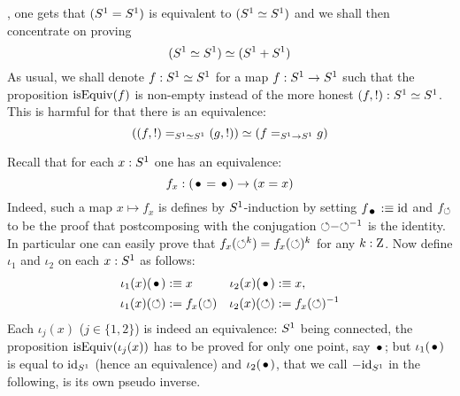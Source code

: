 \documentclass[english,a4paper]{tufte-handout}
\begin{document}
, one gets that $({S^1} = {S^1})$ is
equivalent to $({S^1} \simeq {S^1})$ and we shall then concentrate on
proving
\begin{equation}
  ({S^1} \simeq {S^1}) \simeq ({S^1}+{S^1})
\end{equation}
As usual, we shall denote $f:{S^1}\simeq{S^1}$ for a map $f:{S^1}\to {S^1} $
such that the proposition $\mathrm{isEquiv}(f)$ is non-empty instead of the more
honest $(f,!):{S^1} \simeq {S^1}$. This is harmful for that there is an
equivalence:
\begin{equation}
  ((f,!) =_{{S^1} \simeq {S^1}} (g,!)) \simeq (f=_{{S^1} \to {S^1}}g)
\end{equation}

Recall that for each $x:{S^1}$ one has an equivalence:
\begin{equation}
  \label{eq:8}
  f_x : (\base = \base) \to (x=x)
\end{equation}
Indeed, such a map $x\mapsto f_x$ is defines by ${S^1}$-induction by
setting $f_{\base} \defequi \id$ and $f_{\mathord{\circlearrowleft}}$ to be the proof that
postcomposing with the conjugation $\mathord{\circlearrowleft} \mathord{-} {\mathord{\circlearrowleft}}^{-1}$ is the
identity. In particular one can easily prove that
$f_x(\mathord{\circlearrowleft}^k) = f_x(\mathord{\circlearrowleft})^k$ for any $k:\mathrm{Z}$. Now define $\iota_1$
and $\iota_2$ on each $x:{S^1}$ as follows:
\begin{align*}
  \iota_1(x) (\base) &\defequi x & \iota_2(x) (\base) &\defequi x,
  \\
  \iota_1(x)(\Sloop) &\defis f_x(\Sloop) &  \iota_2(x)(\Sloop) &\defis f_x(\Sloop)^{-1}
\end{align*}
Each $\iota_j(x)$ ($j\in\{1,2\}$) is indeed an equivalence: ${S^1}$
being connected, the proposition $\mathrm{isEquiv}(\iota_j(x))$ has to be proved
for only one point, say $\base$; but $\iota_1(\base)$ is equal to
$\mathord{\mathrm{id}}_{S^1}$ (hence an equivalence) and $\iota_2(\base)$, that we call
$-\mathord{\mathrm{id}}_{S^1}$ in the following, is its own pseudo inverse.
\end{document}

